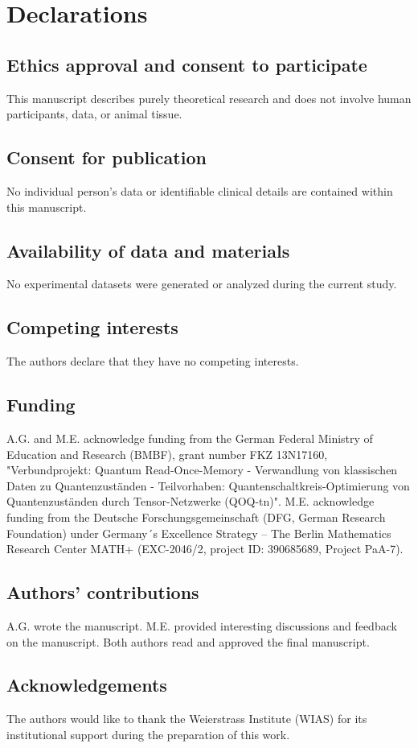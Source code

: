 \section*{Declarations}

\subsection*{Ethics approval and consent to participate}
This manuscript describes purely theoretical research and does not involve human participants, data, or animal tissue.

\subsection*{Consent for publication}
No individual person's data or identifiable clinical details are contained within this manuscript.

\subsection*{Availability of data and materials}
No experimental datasets were generated or analyzed during the current study. %

\subsection*{Competing interests}
The authors declare that they have no competing interests.

\subsection*{Funding}
A.G. and M.E. acknowledge funding from the German Federal Ministry of Education and Research (BMBF), grant number FKZ 13N17160, "Verbundprojekt: Quantum Read-Once-Memory - Verwandlung von klassischen Daten zu Quantenzuständen - Teilvorhaben: Quanten{\allowbreak}schaltkreis-Optimierung von Quantenzuständen durch Tensor-Netzwerke (QOQ-tn)".
M.E. acknowledge funding from the Deutsche Forschungsgemeinschaft (DFG, German Research Foundation) under Germany´s Excellence Strategy – The Berlin Mathematics Research Center MATH+ (EXC-2046/2, project ID: 390685689, Project PaA-7). %

\subsection*{Authors' contributions}
A.G. wrote the manuscript.
M.E. provided interesting discussions and feedback on the manuscript.
Both authors read and approved the final manuscript.

\subsection*{Acknowledgements}
The authors would like to thank the Weierstrass Institute (WIAS) for its institutional support during the preparation of this work.

